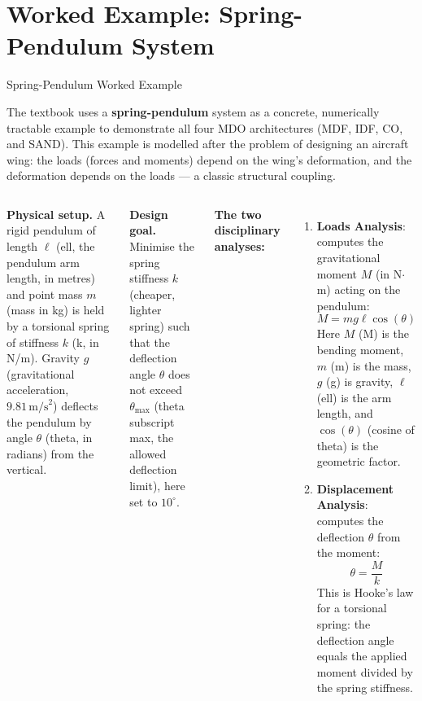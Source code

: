 \documentclass[aspectratio=169,10pt]{beamer}
\begin{document}
\section{Worked Example: Spring-Pendulum System}

\begin{frame}[allowframebreaks]{Spring-Pendulum Worked Example}

  The textbook uses a \textbf{spring-pendulum} system as a concrete,
  numerically tractable example to demonstrate all four MDO architectures
  (MDF, IDF, CO, and SAND).  This example is modelled after the problem of
  designing an aircraft wing: the loads (forces and moments) depend on the
  wing's deformation, and the deformation depends on the loads --- a
  classic structural coupling.

  \begin{columns}[T]
    \textbf{Physical setup.}  A rigid pendulum of length
    $\ell$ (ell, the pendulum arm length, in metres) and point mass
    $m$ (mass in kg) is held by a torsional spring of stiffness $k$
    (k, in N/m).  Gravity $g$ (gravitational acceleration,
    $9.81\,\text{m/s}^2$) deflects the pendulum by angle
    $\theta$ (theta, in radians) from the vertical.

    \medskip
    \textbf{Design goal.}  Minimise the spring stiffness $k$ (cheaper,
    lighter spring) such that the deflection angle $\theta$ does not
    exceed $\theta_{\max}$ (theta subscript max, the allowed deflection
    limit), here set to $10^\circ$.

    \medskip
    \textbf{The two disciplinary analyses:}
    \begin{enumerate}
      \item \textbf{Loads Analysis}: computes the gravitational moment
            $M$ (in N$\cdot$m) acting on the pendulum:
            \[M = mg\ell\cos(\theta)\]
            Here $M$ (M) is the bending moment, $m$ (m) is the mass,
            $g$ (g) is gravity, $\ell$ (ell) is the arm length, and
            $\cos(\theta)$ (cosine of theta) is the geometric factor.
      \item \textbf{Displacement Analysis}: computes the deflection
            $\theta$ from the moment:
            \[\theta = \frac{M}{k}\]
            This is Hooke's law for a torsional spring: the deflection
            angle equals the applied moment divided by the spring stiffness.
    \end{enumerate}


\end{columns}
\end{frame}
\end{document}
